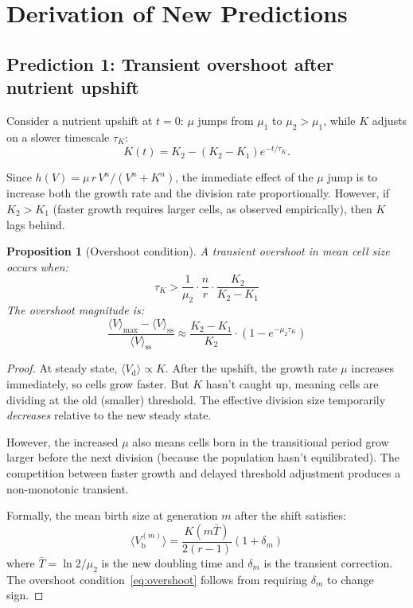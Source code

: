 \documentclass[11pt]{article}
\newcommand{\Vb}{V_{\mathrm{b}}}
\newcommand{\Vd}{V_{\mathrm{d}}}
\newtheorem{proposition}{Proposition}
\begin{document}
\section{Derivation of New Predictions}

\subsection{Prediction 1: Transient overshoot after nutrient upshift}

Consider a nutrient upshift at $t = 0$: $\mu$ jumps from $\mu_1$ to $\mu_2 > \mu_1$, while $K$ adjusts on a slower timescale $\tau_K$:
\begin{equation}
  K(t) = K_2 - (K_2 - K_1)e^{-t/\tau_K}.
\end{equation}

Since $h(V) = \mu\, r\, V^n/(V^n + K^n)$, the immediate effect of the $\mu$ jump is to increase both the growth rate and the division rate proportionally. However, if $K_2 > K_1$ (faster growth requires larger cells, as observed empirically), then $K$ lags behind.

\begin{proposition}[Overshoot condition]
A transient overshoot in mean cell size occurs when:
\begin{equation}
  \boxed{\tau_K > \frac{1}{\mu_2}\cdot\frac{n}{r}\cdot\frac{K_2}{K_2 - K_1}}
  \label{eq:overshoot}
\end{equation}
The overshoot magnitude is:
\begin{equation}
  \frac{\langle V \rangle_{\max} - \langle V \rangle_{\mathrm{ss}}}{\langle V \rangle_{\mathrm{ss}}} \approx \frac{K_2 - K_1}{K_2}\cdot\left(1 - e^{-\mu_2\tau_K}\right)
\end{equation}
\end{proposition}

\begin{proof}
At steady state, $\langle\Vd\rangle \propto K$. After the upshift, the growth rate $\mu$ increases immediately, so cells grow faster. But $K$ hasn't caught up, meaning cells are dividing at the old (smaller) threshold. The effective division size temporarily \emph{decreases} relative to the new steady state.

However, the increased $\mu$ also means cells born in the transitional period grow larger before the next division (because the population hasn't equilibrated). The competition between faster growth and delayed threshold adjustment produces a non-monotonic transient.

Formally, the mean birth size at generation $m$ after the shift satisfies:
\begin{equation}
  \langle\Vb^{(m)}\rangle = \frac{K(m\bar{T})}{2(r-1)}\left(1 + \delta_m\right)
\end{equation}
where $\bar{T} = \ln 2/\mu_2$ is the new doubling time and $\delta_m$ is the transient correction. The overshoot condition~\eqref{eq:overshoot} follows from requiring $\delta_m$ to change sign.
\end{proof}
\end{document}
